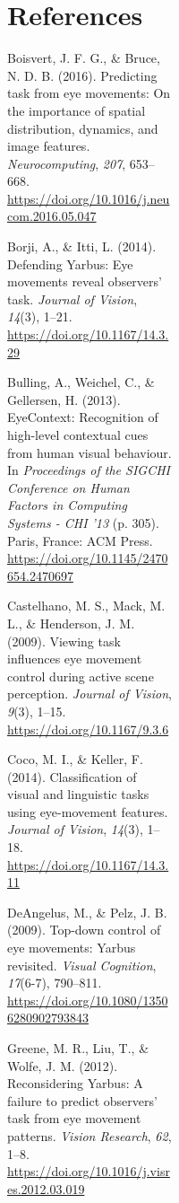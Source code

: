 \documentclass[
  english,
  man, donotrepeattitle,floatsintext]{apa6}
\begin{document}
\begin{figure}
\begin{figure}
\begin{figure}
\begin{figure}
\newpage

\hypertarget{references}{%
\section{References}\label{references}}

\begingroup
\setlength{\parindent}{-0.5in}
\setlength{\leftskip}{0.5in}

\hypertarget{refs}{}
\leavevmode\hypertarget{ref-boisvertPredictingTaskEye2016a}{}%
Boisvert, J. F. G., \& Bruce, N. D. B. (2016). Predicting task from eye movements: On the importance of spatial distribution, dynamics, and image features. \emph{Neurocomputing}, \emph{207}, 653--668. \url{https://doi.org/10.1016/j.neucom.2016.05.047}

\leavevmode\hypertarget{ref-borjiDefendingYarbusEye2014}{}%
Borji, A., \& Itti, L. (2014). Defending Yarbus: Eye movements reveal observers' task. \emph{Journal of Vision}, \emph{14}(3), 1--21. \url{https://doi.org/10.1167/14.3.29}

\leavevmode\hypertarget{ref-bullingEyeContextRecognitionHighlevel2013a}{}%
Bulling, A., Weichel, C., \& Gellersen, H. (2013). EyeContext: Recognition of high-level contextual cues from human visual behaviour. In \emph{Proceedings of the SIGCHI Conference on Human Factors in Computing Systems - CHI '13} (p. 305). Paris, France: ACM Press. \url{https://doi.org/10.1145/2470654.2470697}

\leavevmode\hypertarget{ref-castelhanoViewingTaskInfluences2009a}{}%
Castelhano, M. S., Mack, M. L., \& Henderson, J. M. (2009). Viewing task influences eye movement control during active scene perception. \emph{Journal of Vision}, \emph{9}(3), 1--15. \url{https://doi.org/10.1167/9.3.6}

\leavevmode\hypertarget{ref-cocoClassificationVisualLinguistic2014a}{}%
Coco, M. I., \& Keller, F. (2014). Classification of visual and linguistic tasks using eye-movement features. \emph{Journal of Vision}, \emph{14}(3), 1--18. \url{https://doi.org/10.1167/14.3.11}

\leavevmode\hypertarget{ref-deangelusTopdownControlEye2009a}{}%
DeAngelus, M., \& Pelz, J. B. (2009). Top-down control of eye movements: Yarbus revisited. \emph{Visual Cognition}, \emph{17}(6-7), 790--811. \url{https://doi.org/10.1080/13506280902793843}

\leavevmode\hypertarget{ref-greeneReconsideringYarbusFailure2012c}{}%
Greene, M. R., Liu, T., \& Wolfe, J. M. (2012). Reconsidering Yarbus: A failure to predict observers' task from eye movement patterns. \emph{Vision Research}, \emph{62}, 1--8. \url{https://doi.org/10.1016/j.visres.2012.03.019}


\end{figure}
\end{figure}
\end{figure}
\end{figure}
\end{document}
